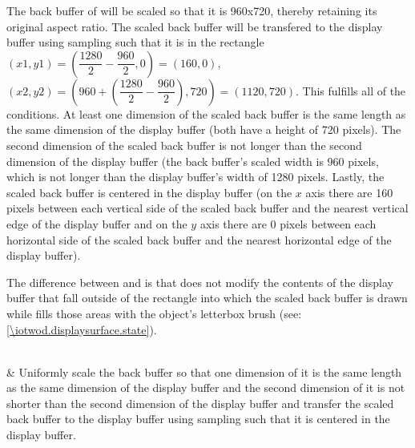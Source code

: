 \begin{libreqtab2}
 \begin{example}
 The back buffer of  will be scaled so that it is 960x720, thereby retaining its original aspect ratio. The scaled back buffer will be transfered to the display buffer using sampling such that it is in the rectangle $(x1,y1) = (\dfrac{1280}{2} - \dfrac{960}{2},0) = (160,0)$, $(x2,y2) = (960 + (\dfrac{1280}{2} - \dfrac{960}{2}),720) = (1120,720)$. This fulfills all of the conditions. At least one dimension of the scaled back buffer is the same length as the same dimension of the display buffer (both have a height of 720 pixels). The second dimension of the scaled back buffer is not longer than the second dimension of the display buffer (the back buffer's scaled width is 960 pixels, which is not longer than the display buffer's width of 1280 pixels. Lastly, the scaled back buffer is centered in the display buffer (on the $x$ axis there are 160 pixels between each vertical side of the scaled back buffer and the nearest vertical edge of the display buffer and on the $y$ axis there are 0 pixels between each horizontal side of the scaled back buffer and the nearest horizontal edge of the display buffer).
 \end{example}
 \begin{note}
 The difference between  and  is that  does not modify the contents of the display buffer that fall outside of the rectangle into which the scaled back buffer is drawn while  fills those areas with the  object's letterbox brush (see: \ref{\iotwod.displaysurface.state}).
 \end{note}
 \\
 & Uniformly scale the back buffer so that one dimension of it is the same length as the same dimension of the display buffer and the second dimension of it is not shorter than the second dimension of the display buffer and transfer the scaled back buffer to the display buffer using sampling such that it is centered in the display buffer.
 

\end{libreqtab2}
